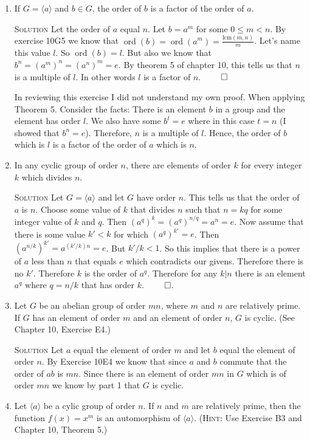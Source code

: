 \documentclass[twoside]{amsart}
\newcommand{\solution}{\textsc{Solution}\xspace}
\newcommand{\blank}{\vspace{5pt}}
\newcommand{\itm}{\blank\item}
\newcommand{\sol}{\blank\noindent\solution}
\newcommand{\ord}{\mathop{\mathrm{ord}}}
\newcommand{\cgroup}[1]{\langle #1 \rangle}
\begin{document}
\begin{enumerate}[A.]
\begin{enumerate}[1)]
      \itm If $G = \langle a \rangle$ and $b \in G$, the order of $b$
      is a factor of the order of $a$.

      \sol Let the order of $a$ equal $n$. Let $b=a^m$ for some $0 \le m < n$.
      By exercise 10G5 we know that $\ord(b) = \ord(a^m) =
      \frac{\mathrm{lcm}(m,n)}{m}$.  Let's name this value $l$.
      So $\ord(b)=l$. But also we know that $b^n = (a^m)^n = (a^n)^m = e$.
      By theorem 5 of chapter 10, this tells us that $n$ is a multiple of
      $l$. In other words $l$ is a factor of $n$. $\qed$

      In reviewing this exercise I did not understand my own
      proof. When applying Theorem 5. Consider the facts: There is an
      element $b$ in a group and the element has order $l$. We also
      have some $b^t = e$ where in this case $t = n$ (I showed that
      $b^n = e$). Therefore, $n$ is a multiple of $l$. Hence, the order
      of $b$ which is $l$ is a factor of the order of $a$ which is
      $n$.

      \itm In any cyclic group of order $n$, there are elements of order $k$
      for every integer $k$ which divides $n$.

      \sol Let $G = \langle a \rangle$ and let $G$ have order $n$. 
      This tells us that the order of $a$ is $n$.
      Choose some value of $k$ that divides $n$ such that 
      $n = kq$ for some integer value of $k$ and $q$. Then
      $(a^q)^k = (a^q)^{n/q} = a^n = e$. Now assume that there
      is some value $k' < k$ for which $(a^q)^{k'} = e$. Then
      $(a^{n/k})^{k'} = a^{(k'/k)n} = e$. But $k'/k < 1$. So this implies
      that there is a power of $a$ less than $n$ that equals $e$ which
      contradicts our givens. Therefore there is no $k'$. Therefore
      $k$ is the order of $a^q$. Therefore for any $k | n$ there is
      an element $a^q$ where $q = n/k$ that has order $k$. $\qed$.

      \itm Let $G$ be an abelian group of order $mn$, where $m$ and $n$
      are relatively prime. If $G$ has an element of order $m$
      and an element of order $n$, $G$ is cyclic. (See Chapter 10,
      Exercise E4.)

      \sol Let $a$ equal the element of order $m$ and let $b$ equal the
      element of order $n$. By Exercise 10E4 we know that since $a$ and
      $b$ commute that the order of $ab$ is $mn$. Since there is an element
      of order $mn$ in $G$ which is of order $mn$ we know by part 1
      that $G$ is cyclic.

      \itm Let $\cgroup{ a }$ be a cylic group of order $n$. 
      If $n$ and $m$ are relatively prime, then the function $f(x) =
      x^m$ is an automorphism of $\cgroup{ a }$. (\textsc{Hint}: Use
      Exercise B3 and Chapter 10, Theorem 5.)


\end{enumerate}
\end{enumerate}
\end{document}
